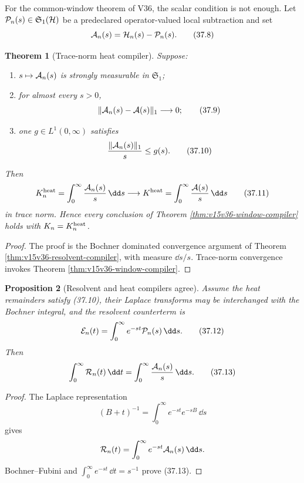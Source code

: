 \documentclass[11pt]{article}
\newtheorem{theorem}{Theorem}[section]
\newtheorem{proposition}[theorem]{Proposition}
\theoremstyle{remark}
\begin{document}
For the common-window theorem of V36, the scalar condition is not
enough.  Let
\({\cal P}_n(s)\in{\mathfrak S}_1({\cal H})\) be a
predeclared operator-valued local subtraction and set
\[
 {\cal A}_n(s)={\cal H}_n(s)-{\cal P}_n(s).              \tag{37.8}
\]

\begin{theorem}[Trace-norm heat compiler]
\label{thm:v15v37-operator-heat}
Suppose:
\begin{enumerate}
\item \(s\mapsto{\cal A}_n(s)\) is strongly measurable in
      \({\mathfrak S}_1\);
\item for almost every \(s>0\),
      \[
       \|{\cal A}_n(s)-{\cal A}(s)\|_1\longrightarrow0;   \tag{37.9}
      \]
\item one \(g\in L^1(0,\infty)\) satisfies
      \[
       \frac{\|{\cal A}_n(s)\|_1}{s}\leq g(s).            \tag{37.10}
      \]
\end{enumerate}
Then
\[
 K_n^{\rm heat}
 =\int_0^\infty\frac{{\cal A}_n(s)}s\,\dd s
 \longrightarrow
 K^{\rm heat}
 =\int_0^\infty\frac{{\cal A}(s)}s\,\dd s               \tag{37.11}
\]
in trace norm.  Hence every conclusion of Theorem
\ref{thm:v15v36-window-compiler} holds with
\(K_n=K_n^{\rm heat}\).
\end{theorem}

\begin{proof}
The proof is the Bochner dominated convergence argument of Theorem
\ref{thm:v15v36-resolvent-compiler}, with measure \(\dd s/s\).
Trace-norm convergence invokes Theorem
\ref{thm:v15v36-window-compiler}.
\end{proof}

\begin{proposition}[Resolvent and heat compilers agree]
\label{prop:v15v37-heat-resolvent}
Assume the heat remainders satisfy (37.10), their Laplace transforms
may be interchanged with the Bochner integral, and the resolvent
counterterm is
\[
 {\cal E}_n(t)=\int_0^\infty e^{-st}{\cal P}_n(s)\,\dd s.
                                                               \tag{37.12}
\]
Then
\[
 \int_0^\infty{\cal R}_n(t)\,\dd t
 =\int_0^\infty\frac{{\cal A}_n(s)}s\,\dd s.             \tag{37.13}
\]
\end{proposition}

\begin{proof}
The Laplace representation
\[
 (B+t)^{-1}=\int_0^\infty e^{-st}e^{-sB}\,\dd s          \tag{37.14}
\]
gives
\[
 {\cal R}_n(t)=
 \int_0^\infty e^{-st}{\cal A}_n(s)\,\dd s.
\]
Bochner--Fubini and
\(\int_0^\infty e^{-st}\,\dd t=s^{-1}\) prove (37.13).
\end{proof}
\end{document}
